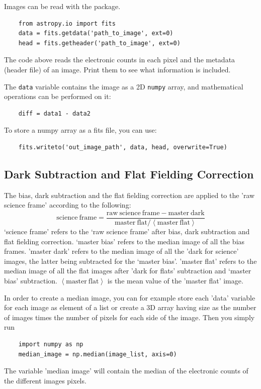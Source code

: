 \documentclass[a4paper, 11pt, fleqn]{memoir}
\begin{document}
Images can be read with the  package.
\begin{verbatim}
    from astropy.io import fits
    data = fits.getdata('path_to_image', ext=0)
    head = fits.getheader('path_to_image', ext=0)
\end{verbatim}
The code above reads the electronic counts in each pixel and the metadata (header file) of an image.
Print them to see what information is included.

The \texttt{data} variable contains the image as a 2D \texttt{numpy} array, and mathematical operations can be performed on it:
\begin{verbatim}
    diff = data1 - data2
\end{verbatim}

To store a numpy array as a fits file, you can use:
\begin{verbatim}
    fits.writeto('out_image_path', data, head, overwrite=True)
\end{verbatim}

\subsection{Dark Subtraction and Flat Fielding Correction}
\label{ssec:dark-flat-correction}

The bias, dark subtraction and the flat fielding correction are applied to the 'raw science frame' according to the following:
\begin{equation}
    \mathrm{science\ frame} = \frac{\mathrm{raw\ science\ frame} - \mathrm{master\ dark} }{\mathrm{master\ flat} / \left \langle \mathrm{master\ flat} \right \rangle} \label{correction}
\end{equation}
`science frame' refers to the `raw science frame' after bias, dark subtraction and flat fielding correction.
`master bias' refers to the median image of all the bias frames. 'master dark' refers to the median image of all the 'dark for science' images, the latter being subtracted for the `master bias'. 'master flat' refers to the median image of all the flat images after 'dark for flats' subtraction and `master bias' subtraction. $ \left \langle \mathrm{master\ flat} \right \rangle$ is the mean value of the 'master flat' image.


In order to create a median image, you can for example store each 'data' variable for each image as element of a list or create a 3D array having size as the number of images times the number of pixels for each side of the image.
Then you simply run
\begin{verbatim}
    import numpy as np
    median_image = np.median(image_list, axis=0)
\end{verbatim}
The variable 'median image' will contain the median of the electronic counts of the different images pixels.
\end{document}
